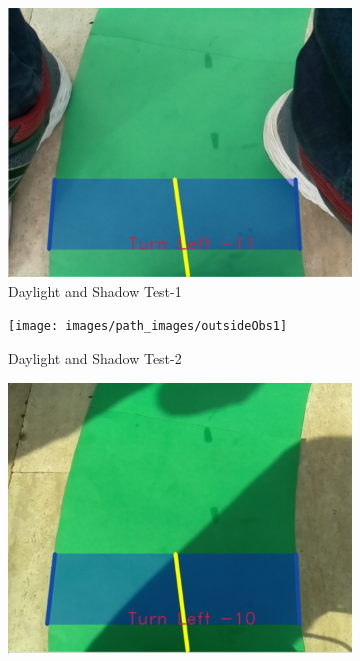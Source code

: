 \documentclass[a4paper,12pt]{article}
\begin{document}
\begin{figure}[H]

\setlength{\unitlength}{\textwidth} 

\centering

\begin{subfigure}{.31\textwidth}

\centering

\includegraphics[width=0.30\unitlength]{images/path_images/outsideObs0}

\caption{\label{fig:dataP_outsideObs0} Daylight and Shadow Test-1}

\end{subfigure}%
\begin{subfigure}{.31\textwidth}

\centering

\texttt{[image: images/path\_images/outsideObs1]}

\caption{\label{fig:dataP_outsideObs1} Daylight and Shadow Test-2}

\end{subfigure}
\begin{subfigure}{.31\textwidth}

\centering

\includegraphics[width=0.30\unitlength]{images/path_images/outsideObs2}


\end{subfigure}
\end{figure}
\end{document}
